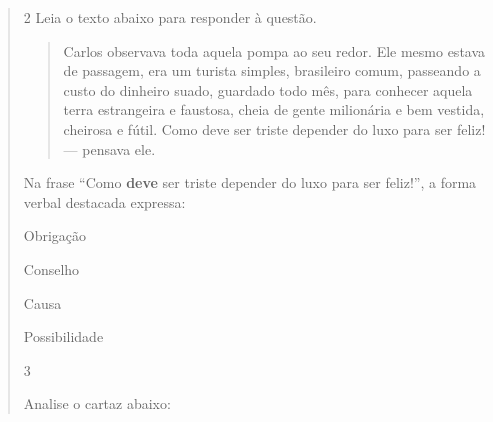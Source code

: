 \begin{quote}
\num{2} Leia o texto abaixo para responder à questão. 

\begin{quote}

Carlos observava toda aquela pompa ao seu redor. Ele mesmo estava de passagem,
era um turista simples, brasileiro comum, passeando a custo do dinheiro suado, 
guardado todo mês, para conhecer aquela terra estrangeira e faustosa, cheia de 
gente milionária e bem vestida, cheirosa e fútil. Como deve ser triste depender
do luxo para ser feliz! --- pensava ele.     

\end{quote}


Na frase ``Como \textbf{deve} ser triste depender do luxo para ser feliz!'', 
a forma verbal destacada expressa:

\begin{escolha}
  
  \item Obrigação
  
  \item Conselho
  
  \item Causa
  
  \item Possibilidade

\end{escolha}


\num{3}

Analise o cartaz abaixo:


\end{quote}
